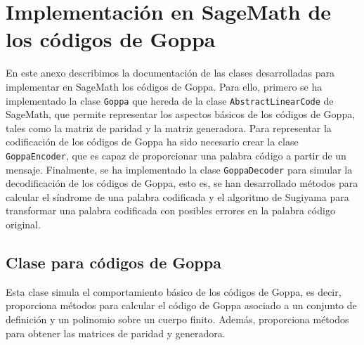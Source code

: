 \chapter[Implementación en SageMath de los códigos de Goppa]{Implementación en SageMath de los códigos de Goppa}
\label{annex:sage-Goppa}

En este anexo describimos la documentación de las clases desarrolladas para implementar en SageMath los códigos de Goppa. Para ello, primero se ha implementado la clase \texttt{Goppa} que hereda de la clase \texttt{AbstractLinearCode} de SageMath, que permite representar los aspectos básicos de los códigos de Goppa, tales como la matriz de paridad y la matriz generadora. Para representar la codificación de los códigos de Goppa ha sido necesario crear la clase \texttt{GoppaEncoder}, que es capaz de proporcionar una palabra código a partir de un mensaje. Finalmente, se ha implementado la clase \texttt{GoppaDecoder} para simular la decodificación de los códigos de Goppa, esto es, se han desarrollado métodos para calcular el síndrome de una palabra codificada y el algoritmo de Sugiyama para transformar una palabra codificada con posibles errores en la palabra código original.


\section{Clase para códigos de Goppa}

Esta clase simula el comportamiento básico de los códigos de Goppa, es decir, proporciona métodos para calcular el código de Goppa asociado a un conjunto de definición y un polinomio sobre un cuerpo finito. Además, proporciona métodos para obtener las matrices de paridad y generadora.

